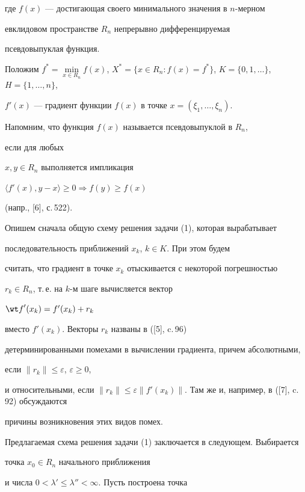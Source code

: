 где $f(x)$ --- достигающая своего минимального значения в $n$-мерном


евклидовом пространстве $R_n$ непрерывно дифференцируемая


псевдовыпуклая функция.





Положим $f^*=\min\limits_{x\in R_n}f(x)$, $X^*= \{{x\in R_n:


f(x)=f^*} \}$, $K= \{{0,1,\dotsc} \}$, $H=\{1,\dotsc,n\}$,


${f}'(x)$ --- градиент функции $f(x)$ в точке $x=(\xi_1,\dotsc,\xi_n)$.


Напомним, что функция $f(x)$ называется псевдовыпуклой в $R_n$,


если для любых


$x,y\in R_n$ выполняется импликация


$\langle {{f}'(x),y-x} \rangle \ge 0 \Rightarrow f(y)\ge f(x)$


(напр., [6], с.\,522).





Опишем сначала общую схему решения задачи (1), которая вырабатывает


последовательность приближений $x_k$, $k\in K$. При этом будем


считать, что градиент в точке $x_k$ отыскивается с некоторой погрешностью


$r_k\in R_n$, т.\,е. на $k$-м шаге вычисляется вектор


${\wt f}'(x_k)= {f}'(x_k) +r_k$


вместо ${f}'(x_k)$. Векторы $r_k$ названы в ([5], c.\,96)


детерминированными помехами в вычислении градиента, причем абсолютными,


если $\|{r_k} \|\le \varepsilon$, $\varepsilon \ge 0$,


и относительными, если $\|{r_k} \|\le \varepsilon \|


{{f}'(x_k)} \|$. Там же и, например, в ([7], c.\,92) обсуждаются


причины возникновения этих видов помех.





Предлагаемая схема решения задачи (1) заключается в следующем. Выбирается


точка $x_0\in R_n$ начального приближения


и числа $0<\lambda'\le\lambda''<\infty$. Пусть построена точка


